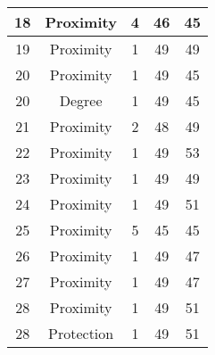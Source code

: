 \documentclass[results.tex]{subfiles}
\begin{document}
\begin{center}
\begin{tabular}{| c || c | c | c | c |}
            \hline
            18                      & Proximity                    & 4                      & 46                      & 45                   \\
            \hline
            19                      & Proximity                    & 1                      & 49                      & 49                   \\
            \hline
            20                      & Proximity                    & 1                      & 49                      & 45                   \\
            \hline
            20                      & Degree                       & 1                      & 49                      & 45                   \\
            \hline
            21                      & Proximity                    & 2                      & 48                      & 49                   \\
            \hline
            22                      & Proximity                    & 1                      & 49                      & 53                   \\
            \hline
            23                      & Proximity                    & 1                      & 49                      & 49                   \\
            \hline
            24                      & Proximity                    & 1                      & 49                      & 51                   \\
            \hline
            25                      & Proximity                    & 5                      & 45                      & 45                   \\
            \hline
            26                      & Proximity                    & 1                      & 49                      & 47                   \\
            \hline
            27                      & Proximity                    & 1                      & 49                      & 47                   \\
            \hline
            28                      & Proximity                    & 1                      & 49                      & 51                   \\
            \hline
            28                      & Protection                   & 1                      & 49                      & 51                   \\

\end{tabular}
\end{center}
\end{document}
